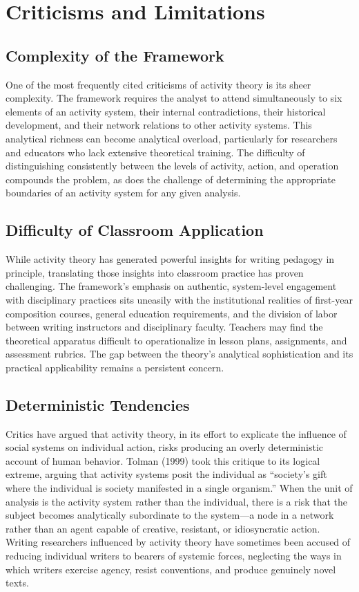 \documentclass[12pt]{article}
\begin{document}
\section{Criticisms and Limitations}

\subsection{Complexity of the Framework}

One of the most frequently cited criticisms of activity theory is its sheer complexity. The framework requires the analyst to attend simultaneously to six elements of an activity system, their internal contradictions, their historical development, and their network relations to other activity systems. This analytical richness can become analytical overload, particularly for researchers and educators who lack extensive theoretical training. The difficulty of distinguishing consistently between the levels of activity, action, and operation compounds the problem, as does the challenge of determining the appropriate boundaries of an activity system for any given analysis.

\subsection{Difficulty of Classroom Application}

While activity theory has generated powerful insights for writing pedagogy in principle, translating those insights into classroom practice has proven challenging. The framework's emphasis on authentic, system-level engagement with disciplinary practices sits uneasily with the institutional realities of first-year composition courses, general education requirements, and the division of labor between writing instructors and disciplinary faculty. Teachers may find the theoretical apparatus difficult to operationalize in lesson plans, assignments, and assessment rubrics. The gap between the theory's analytical sophistication and its practical applicability remains a persistent concern.

\subsection{Deterministic Tendencies}

Critics have argued that activity theory, in its effort to explicate the influence of social systems on individual action, risks producing an overly deterministic account of human behavior. Tolman (1999) took this critique to its logical extreme, arguing that activity systems posit the individual as ``society's gift where the individual is society manifested in a single organism.'' When the unit of analysis is the activity system rather than the individual, there is a risk that the subject becomes analytically subordinate to the system---a node in a network rather than an agent capable of creative, resistant, or idiosyncratic action. Writing researchers influenced by activity theory have sometimes been accused of reducing individual writers to bearers of systemic forces, neglecting the ways in which writers exercise agency, resist conventions, and produce genuinely novel texts.
\end{document}
